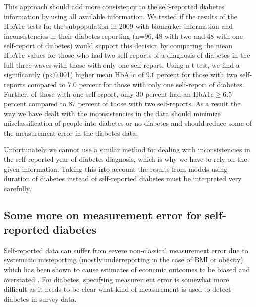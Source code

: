 This approach should add more consistency to the self-reported diabetes
information by using all available information. We tested if the results
of the \ac{HbA1c} tests for the subpopulation in 2009 with biomarker
information and inconsistencies in their diabetes reporting (n=96,
48 with two and 48 with one self-report of diabetes) would support
this decision by comparing the mean \ac{HbA1c} values for those who
had two self-reports of a diagnosis of diabetes in the full three
waves with those with only one self-report. Using a t-test, we find
a significantly (p<0.001) higher mean \ac{HbA1c} of 9.6 percent for
those with two self-reports compared to 7.0 percent for those with
only one self-report of diabetes. Further, of those with one self-report,
only 30 percent had an \ac{HbA1c}$\geq6.5$percent compared
to 87 percent of those with two self-reports. As a result the way
we have dealt with the inconsistencies in the data should minimize
misclassification of people into diabetes or no-diabetes and should
reduce some of the measurement error in the diabetes data. 

Unfortunately we cannot use a similar method for dealing with inconsistencies
in the self-reported year of diabetes diagnosis, which is why we have
to rely on the given information. Taking this into account the results
from models using duration of diabetes instead of self-reported diabetes
must be interpreted very carefully.


\subsection{Some more on measurement error for self-reported diabetes}

Self-reported data can suffer from severe non-classical measurement
error due to systematic misreporting (mostly underreporting in the
case of \ac{BMI} or obesity) which has been shown to cause estimates
of economic outcomes to be biased and overstated \citep{Cawley2015,ONeill2013,Perks2015}.
For diabetes, specifying measurement error is somewhat more difficult
as it needs to be clear what kind of measurement is used to detect
diabetes in survey data.


